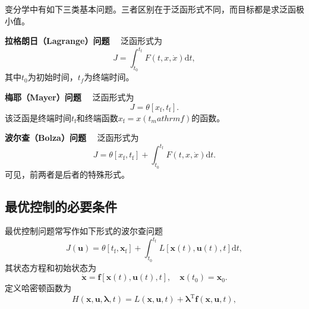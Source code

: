 变分学中有如下三类基本问题。三者区别在于泛函形式不同，而目标都是求泛函极小值。

\textbf{拉格朗日（Lagrange）问题} \ \ 泛函形式为
\begin{equation}
J = \int_{t_0}^{t_\mathrm{f}}F(t,x,\dot{x})\mathrm{d}t,
\end{equation}
其中$t_0$为初始时间，$t_f$为终端时间。

\textbf{梅耶（Mayer）问题} \ \ 泛函形式为
\begin{equation}
J=\theta[x_\mathrm{f},t_\mathrm{f}].
\end{equation}
该泛函是终端时间$t_\mathrm{f}$和终端函数$x_\mathrm{f}=x(t_mathrm{f})$的函数。

\textbf{波尔查（Bolza）问题} \ \ 泛函形式为
\begin{equation}
J=\theta[x_\mathrm{f},t_\mathrm{f}]+\int_{t_0}^{t_\mathrm{f}}F(t,x,\dot{x})\mathrm{d}t.
\end{equation}
可见，前两者是后者的特殊形式。

\subsection{最优控制的必要条件}
最优控制问题常写作如下形式的波尔查问题
\begin{equation}
J(\bm{u})=\theta[t_\mathrm{f},\bm{x}_\mathrm{f}]+\int_{t_0}^{t_\mathrm{f}}L[\bm{x}(t),\bm{u}(t),t]\mathrm{d}t,
\end{equation}
其状态方程和初始状态为
\begin{equation}
\dot{\bm{x}}=\bm{f}[\bm{x}(t),\bm{u}(t),t], \quad \bm{x}(t_0)=\bm{x}_0.
\end{equation}
定义{\heiti 哈密顿函数}为
\begin{equation}
H(\bm{x},\bm{u},\bm{\lambda},t)=L(\bm{x},\bm{u},t)+\bm{\lambda}^\mathrm{T}\bm{f}(\bm{x},\bm{u},t),
\end{equation}

